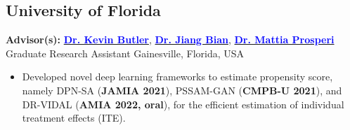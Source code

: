   
    \subsection{University of Florida}
      {{\bf Advisor(s):} 
        {\href{https://www.cise.ufl.edu/~butler/}
        { \textbf{\textcolor{blue}{Dr. Kevin Butler}}}},
        {\href{https://scholar.google.com/citations?user=ysr--voAAAAJ&hl=en}
        { \textbf{\textcolor{blue}{Dr. Jiang Bian}}}},
        {\href{https://epidemiology.phhp.ufl.edu/profile/prosperi-mattia/}
        { \textbf{\textcolor{blue}{Dr. Mattia Prosperi}}}}
        }%
      {Graduate Research Assistant}%
      {Gainesville, Florida, USA}%
      {}%
      {
       \begin{itemize}[itemsep=0pt, parsep=0pt]
        \item Developed novel deep learning frameworks to estimate propensity score, namely DPN-SA (\textbf{JAMIA 2021}), PSSAM-GAN (\textbf{CMPB-U 2021}), and DR-VIDAL (\textbf{AMIA 2022, oral}), for the efficient estimation of individual treatment effects (ITE).
        \end{itemize}
      }
        
